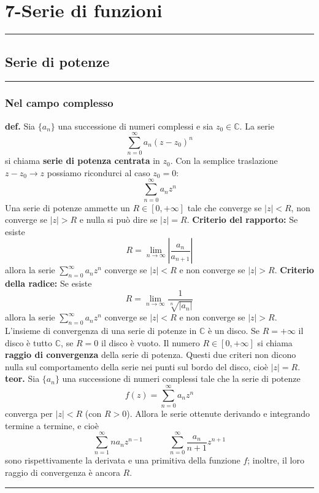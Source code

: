 \section*{7-Serie di funzioni}
\rule{\textwidth}{2pt}
\subsection*{Serie di potenze}
\rule{\textwidth}{0,4pt}
\subsubsection*{Nel campo complesso}
\textbf{def.} Sia $\{a_n\}$ una successione di numeri complessi e sia $z_0 \in \mathbb{C}$.\newline
La serie
\[
    \sum_{n=0}^{\infty} a_n (z-z_0)^n
\]
si chiama \textbf{serie di potenza centrata} in $z_0$.\newline
\newline
Con la semplice traslazione $z-z_0 \rightarrow z$ possiamo ricondurci al caso $z_0 = 0$:
\[
    \sum_{n=0}^{\infty}a_n z^n
\]
\newline
Una serie di potenze ammette un $R \in [0, +\infty]$ tale che converge se $|z| < R$, non converge se $|z| > R$ e nulla si può dire se $|z| = R$.\newline
\newline
\textbf{Criterio del rapporto:} Se esiste
\[
    R = \lim_{n\rightarrow \infty}\left| \frac{a_n}{a_{n+1}}\right|
\]
allora la serie $\sum_{n=0}^{\infty}a_n z^n$ converge se $|z|< R$ e non converge se $|z|> R$.\newline
\newline
\textbf{Criterio della radice:} Se esiste
\[
    R = \lim_{n\rightarrow \infty} \frac{1}{\sqrt[n]{|a_n|}}
\]
allora la serie $\sum_{n=0}^{\infty}a_n z^n$ converge se $|z| < R$ e non converge se $|z|> R$.\newline
\newline
L'insieme di convergenza di una serie di potenze in $\mathbb{C}$ è un disco.\newline
Se $R = +\infty$ il disco è tutto $\mathbb{C}$, se $R = 0$ il disco è vuoto. Il numero $R \in [0, + \infty]$ si chiama \textbf{raggio di convergenza} della serie di potenza.\newline
\newline
Questi due criteri non dicono nulla sul comportamento della serie nei punti sul bordo del disco, cioè $|z| = R$.\newline
\newline
\textbf{teor.} Sia $\{a_n\}$ una successione di numeri complessi tale che la serie di potenze
\[
    f(z) = \sum_{n=0}^{\infty} a_n z^n
\]
converga per $|z|<R$ (con $R> 0$). Allora le serie ottenute derivando e integrando termine a termine, e cioè
\[
    \sum_{n=1}^{\infty} n a_n z^{n-1} \quad \quad \quad \sum_{n=0}^{\infty} \frac{a_n}{n+1} z^{n+1}
\]
sono rispettivamente la derivata e una primitiva della funzione $f$; inoltre, il loro raggio di convergenza è ancora $R$.\newline
\newline
\rule{\textwidth}{0,4pt}
